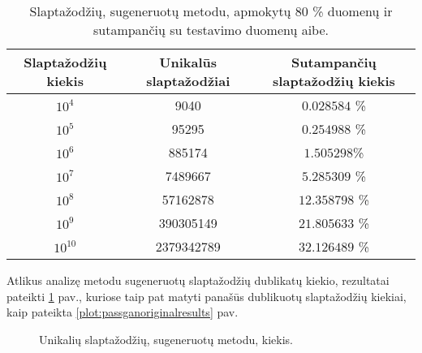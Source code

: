 \documentclass{VUMIFInfBakalaurinis}
\begin{document}
\begin{table}[hb]
  \centering
  \caption{
    Slaptažodžių, sugeneruotų  metodu, apmokytų 80 \% 
     duomenų ir sutampančių su  testavimo 
    duomenų aibe.
  }
  \begin{tabular}{|c|c|c|}
    \hline \textbf{Slaptažodžių kiekis} & \textbf{Unikalūs slaptažodžiai} & 
    \textbf{Sutampančių slaptažodžių kiekis} \\
    \hline $10^4$ & 9040 & $0.028584$ \% \\
    \hline $10^5$ & 95295 & $0.254988$ \% \\
    \hline $10^6$ & 885174 & $1.505298$\% \\
    \hline $10^7$ & 7489667 & $5.285309$ \% \\
    \hline $10^8$ & 57162878 & $12.358798$ \% \\
    \hline $10^9$ & 390305149 & $21.805633$ \% \\
    \hline $10^{10}$ & 2379342789 & $32.126489$ \% \\
    \hline
  \end{tabular}
  \label{tab:passganrockyouresults}
\end{table}

Atlikus analizę  metodu sugeneruotų slaptažodžių dublikatų 
kiekio, rezultatai pateikti \ref{plot:passganrockyouresults} pav., kuriose taip 
pat matyti panašūs dublikuotų slaptažodžių kiekiai, kaip pateikta 
\ref{plot:passganoriginalresults} pav.

\begin{figure}[!ht]
  \begin{center}
  \end{center}
  \caption{
    Unikalių slaptažodžių, sugeneruotų  metodu, kiekis.
  }
  \label{plot:passganrockyouresults}
\end{figure}
\end{document}
